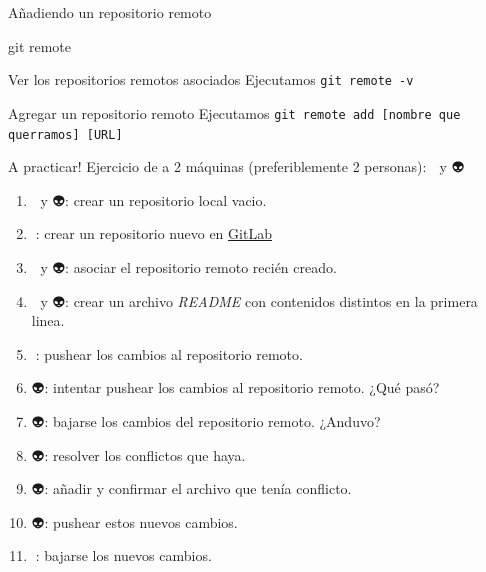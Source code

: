 \begin{frame}[t]{Añadiendo un repositorio remoto}
    \begin{comando}
        git remote
    \end{comando}

    \vspace{0.5em}
    \pause
    \begin{block}{Ver los repositorios remotos asociados}
        Ejecutamos \texttt{git remote -v}
    \end{block}

    \pause
    \begin{block}{Agregar un repositorio remoto}
        Ejecutamos \texttt{git remote add [nombre que querramos] [URL]}
    \end{block}
\end{frame}

\begin{frame}[t]{A practicar!}
    Ejercicio de a 2 máquinas (preferiblemente 2 personas): 👾 y 👽

    \begin{enumerate}
        \pause
        \item 👾 y 👽: crear un repositorio local vacio.
        \pause
        \item 👾: crear un repositorio nuevo en \href{https://www.gitlab.com}{GitLab}
        \pause
        \item 👾 y 👽: asociar el repositorio remoto recién creado.
        \pause
        \item 👾 y 👽: crear un archivo \textit{README} con contenidos distintos en la primera linea.
        \pause
        \item 👾: pushear los cambios al repositorio remoto.
        \pause
        \item 👽: intentar pushear los cambios al repositorio remoto. ¿Qué pasó?
        \pause
        \item 👽: bajarse los cambios del repositorio remoto. ¿Anduvo?
        \pause
        \item 👽: resolver los conflictos que haya.
        \pause
        \item 👽: añadir y confirmar el archivo que tenía conflicto.
        \pause
        \item 👽: pushear estos nuevos cambios.
        \pause
        \item 👾: bajarse los nuevos cambios.
    \end{enumerate}
\end{frame}
